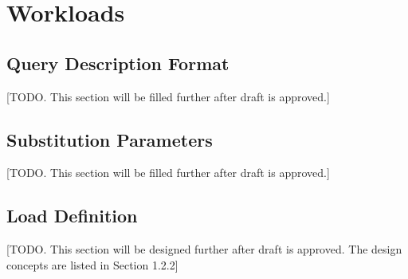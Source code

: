 \chapter{Workloads}
\label{section:workloads}

\section{Query Description Format}
[TODO. This section will be filled further after draft is approved.]


\section{Substitution Parameters}
[TODO. This section will be filled further after draft is approved.]


\section{Load Definition}
[TODO. This section will be designed further after draft is approved. The design concepts are listed in Section 1.2.2]

